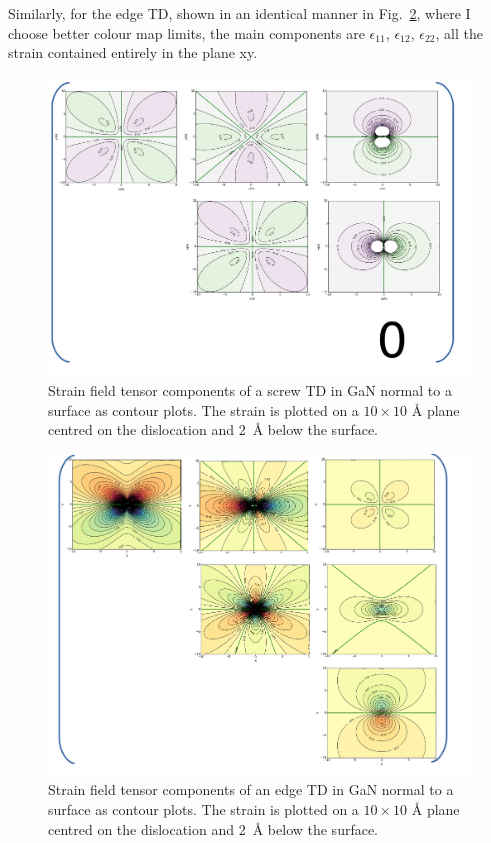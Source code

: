 Similarly, for the edge TD, shown in an identical manner in Fig.~\ref{Fig:edgeMatrix}, where I choose better colour map limits, the main components are $\epsilon_11$, $\epsilon_12$, $\epsilon_22$, \ie all the strain contained entirely in the plane xy. 
\begin{figure}
    \centering
\includegraphics[width=1\linewidth]{Figures/screw_matrix.pdf}
\caption[Screw TD strain tensor.]{Strain field tensor components of a screw TD in GaN normal to a surface as contour plots. The strain is plotted on a $10 \times 10$ \si{\angstrom} plane centred on the dislocation and \SI{2}{\angstrom} below the surface.  }
\label{Fig:screwMatrix}
\end{figure}



\begin{figure}
    \centering
\includegraphics[width=1\linewidth]{Figures/edge_matrix.pdf}
\caption[Edge TD strain tensor.]{Strain field tensor components of an edge TD in GaN normal to a surface as contour plots. The strain is plotted on a $10 \times 10$ \si{\angstrom} plane centred on the dislocation and \SI{2}{\angstrom} below the surface.  }
\label{Fig:edgeMatrix}
\end{figure}

